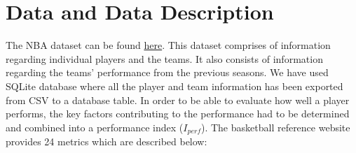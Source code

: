 \documentclass{acm_proc_article-sp}
\begin{document}
\section{Data and Data Description}
\vspace{0.5em}
The NBA dataset can be found \href{http://www.basketball-reference.com/teams/}{here}. This dataset comprises of information regarding individual players and the teams. It also consists of information regarding the teams' performance from the previous seasons. We have used SQLite database where all the player and team information has been exported from CSV to a database table. 
In order to be able to evaluate how well a player performs, the key factors contributing to the performance had to be determined and combined into a performance index ($I_{perf}$). The basketball reference website provides 24 metrics which are described below: 
\end{document}
